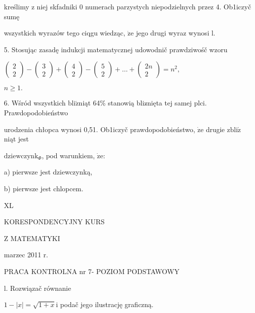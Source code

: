 \documentclass[a4paper,12pt]{article}
\begin{document}
kreślimy $\mathrm{z}$ niej skfadniki $0$ numerach parzystych niepodzielnych przez 4. Ob1iczyč sumę

wszystkich wyrazów tego ciqgu wiedząc, $\dot{\mathrm{z}}\mathrm{e}$ jego drugi wyraz wynosi l.

5. Stosując zasadę indukcji matematycznej udowodnič prawdziwośč wzoru

$\left(\begin{array}{l}
2\\
2
\end{array}\right) - \left(\begin{array}{l}
3\\
2
\end{array}\right) + \left(\begin{array}{l}
4\\
2
\end{array}\right) - \left(\begin{array}{l}
5\\
2
\end{array}\right) +\ldots+\left(\begin{array}{l}
2n\\
2
\end{array}\right) =n^{2},$

$n\geq 1.$

6. Wśród wszystkich $\mathrm{b}\mathrm{l}\mathrm{i}\acute{\mathrm{z}}$niąt 64\% stanowią bliz$\acute{}$nięta tej samej plci. Prawdopodobieństwo

urodzenia chłopca wynosi 0,51. Ob1iczyč prawdopodobieństwo, $\dot{\mathrm{z}}\mathrm{e}$ drugie $\mathrm{z}\mathrm{b}\mathrm{l}\mathrm{i}\acute{\mathrm{z}}$niąt jest

$\mathrm{d}\mathrm{z}\mathrm{i}\mathrm{e}\mathrm{w}\mathrm{c}\mathrm{z}\mathrm{y}\mathrm{n}\mathrm{k}_{\Phi}$, pod warunkiem, $\dot{\mathrm{z}}\mathrm{e}$:

a) pierwsze jest dziewczynką,

b) pierwsze jest chlopcem.





XL

KORESPONDENCYJNY KURS

Z MATEMATYKI

marzec 2011 r.

PRACA KONTROLNA nr 7- POZIOM PODSTAWOWY

l. Rozwiązač równanie

$1-|x|=\sqrt{1+x} \mathrm{i}$ podač jego ilustrację graficzną.
\end{document}
